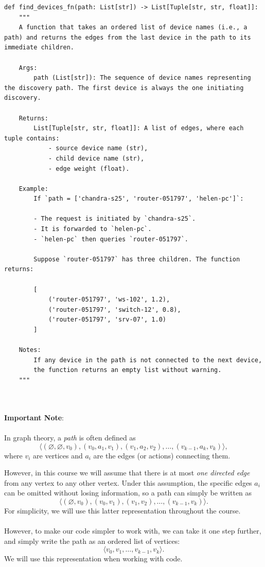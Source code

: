 \documentclass[12pt]{report}
\begin{document}
\begin{lstlisting}
def find_devices_fn(path: List[str]) -> List[Tuple[str, str, float]]:
    """
    A function that takes an ordered list of device names (i.e., a path) and returns the edges from the last device in the path to its immediate children.

    Args:
        path (List[str]): The sequence of device names representing the discovery path. The first device is always the one initiating discovery.

    Returns:
        List[Tuple[str, str, float]]: A list of edges, where each tuple contains:
            - source device name (str),
            - child device name (str),
            - edge weight (float).

    Example:
        If `path = ['chandra-s25', 'router-051797', 'helen-pc']`:

        - The request is initiated by `chandra-s25`.
        - It is forwarded to `helen-pc`.
        - `helen-pc` then queries `router-051797`.

        Suppose `router-051797` has three children. The function returns:

        [
            ('router-051797', 'ws-102', 1.2),
            ('router-051797', 'switch-12', 0.8),
            ('router-051797', 'srv-07', 1.0)
        ]

    Notes:
        If any device in the path is not connected to the next device, 
        the function returns an empty list without warning.
    """
\end{lstlisting}

\\~\\
\textbf{Important Note}:
\\~\\
In graph theory, a \emph{path} is often defined as
\[
\langle (\varnothing, \varnothing, v_0), (v_0, a_1, v_1), (v_1, a_2, v_2), \dots, (v_{k-1}, a_k, v_k) \rangle,
\]
where $v_i$ are vertices and $a_i$ are the edges (or actions) connecting them.

However, in this course we will assume that there is at most \emph{one directed edge} from any vertex to any other vertex. Under this assumption, the specific edges $a_i$ can be omitted without losing information, so a path can simply be written as
\[
\langle (\varnothing, v_0), (v_0, v_1), (v_1, v_2), \dots, (v_{k-1}, v_k) \rangle.
\]
For simplicity, we will use this latter representation throughout the course.
\\~\\
However, to make our code simpler to work with, we can take it one step further, and simply write the path as an ordered list of vertices:
\[\langle v_0, v_1, \dots, v_{k-1}, v_k \rangle.\]
We will use this representation when working with code.
\end{document}
